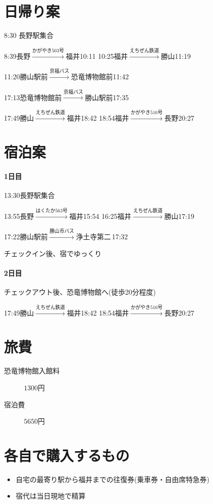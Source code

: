 \documentclass[platex,dvipdfmx]{jlreq}			%
\begin{document}
\section{日帰り案}
8:30 長野駅集合

8:39長野$\xrightarrow{かがやき503号}$福井10:11
10:25福井$\xrightarrow{えちぜん鉄道}$勝山11:19

11:20勝山駅前$\xrightarrow{京福バス}$恐竜博物館前11:42

17:13恐竜博物館前$\xrightarrow{京福バス}$勝山駅前17:35

17:49勝山$\xrightarrow{えちぜん鉄道}$福井18:42
18:54福井$\xrightarrow{かがやき516号}$長野20:27

\section{宿泊案}

\paragraph{1日目}
13:30長野駅集合

13:55長野$\xrightarrow{はくたか563号}$福井15:54
16:25福井$\xrightarrow{えちぜん鉄道}$勝山17:19

17:22勝山駅前$\xrightarrow{勝山市バス}$浄土寺第二\,17:32

チェックイン後、宿でゆっくり
\paragraph{2日目}
チェックアウト後、恐竜博物館へ(徒歩20分程度)

17:49勝山$\xrightarrow{えちぜん鉄道}$福井18:42
18:54福井$\xrightarrow{かがやき516号}$長野20:27
\section{旅費}
\begin{description}
  \item[恐竜博物館入館料] $1300$円
  \item[宿泊費] $5650$円
\end{description}

\section{各自で購入するもの}
\begin{itemize}
  \item 自宅の最寄り駅から福井までの往復券(乗車券・自由席特急券)
  \item 宿代は当日現地で精算
\end{itemize}
\end{document}
